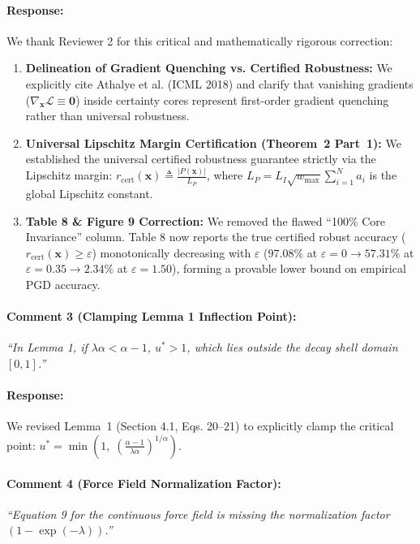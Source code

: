 \documentclass[10pt]{article}
\begin{document}
\paragraph{Response:}
We thank Reviewer 2 for this critical and mathematically rigorous correction:
\begin{enumerate}
    \item \textbf{Delineation of Gradient Quenching vs. Certified Robustness:} We explicitly cite Athalye et al. (ICML 2018) and clarify that vanishing gradients ($\nabla_{\mathbf{x}} \mathcal{L} \equiv \mathbf{0}$) inside certainty cores represent first-order gradient quenching rather than universal robustness.
    \item \textbf{Universal Lipschitz Margin Certification (Theorem~2 Part~1):} We established the universal certified robustness guarantee strictly via the Lipschitz margin: $r_{\mathrm{cert}}(\mathbf{x}) \triangleq \frac{|P(\mathbf{x})|}{L_P}$, where $L_P = L_I \sqrt{w_{\max}} \sum_{i=1}^N a_i$ is the global Lipschitz constant.
    \item \textbf{Table 8 \& Figure 9 Correction:} We removed the flawed ``100\% Core Invariance'' column. Table 8 now reports the true certified robust accuracy ($r_{\mathrm{cert}}(\mathbf{x}) \ge \varepsilon$) monotonically decreasing with $\varepsilon$ ($97.08\%$ at $\varepsilon=0 \to 57.31\%$ at $\varepsilon=0.35 \to 2.34\%$ at $\varepsilon=1.50$), forming a provable lower bound on empirical PGD accuracy.
\end{enumerate}

\paragraph{Comment 3 (Clamping Lemma 1 Inflection Point):}
\textit{``In Lemma 1, if $\lambda \alpha < \alpha - 1$, $u^* > 1$, which lies outside the decay shell domain $[0, 1]$.''}

\paragraph{Response:}
We revised Lemma~1 (Section 4.1, Eqs. 20--21) to explicitly clamp the critical point: $u^* = \min\left(1, \; \left(\frac{\alpha - 1}{\lambda \alpha}\right)^{1/\alpha}\right)$.

\paragraph{Comment 4 (Force Field Normalization Factor):}
\textit{``Equation 9 for the continuous force field is missing the normalization factor $(1 - \exp(-\lambda))$.''}
\end{document}
